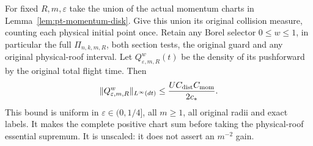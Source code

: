 \begin{theorem}
\label{thm:pt-common-roof}
For fixed $R,m,\varepsilon$ take the union of the actual momentum
charts in Lemma~\ref{lem:pt-momentum-disk}.  Give this union its
original collision measure, counting each physical initial point once.
Retain any Borel selector $0\le w\le1$, in particular the full
$\Pi_{n,k,m,R}$, both section tests, the original guard and any
original physical-roof interval.  Let $Q^w_{\varepsilon,m,R}(t)$
be the density of its pushforward by the original total flight time.
Then
\begin{equation}\label{eq:pt-common-roof}
 \|Q^w_{\varepsilon,m,R}\|_{L^\infty(dt)}
       \le \frac{U C_{\rm dist}C_{\rm mom}}{2c_*}.
\end{equation}
This bound is uniform in $\varepsilon\in(0,1/4]$, all $m\ge1$,
all original radii and exact labels.  It makes the complete positive
chart sum before taking the physical-roof essential supremum.
It is unscaled: it does not assert an $m^{-2}$ gain.
\end{theorem}
